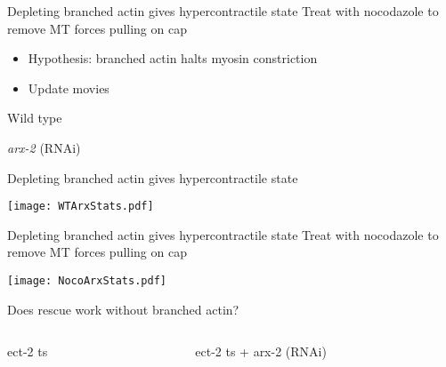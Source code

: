 \documentclass{beamer}
\newcommand{\6}[1]{#1_{\text{6}}}
\newcommand{\3}[1]{#1_{\text{3}}}
\newcommand{\red}[1]{\color{red}#1\normalcolor}
\begin{document}
\begin{frame}{Depleting branched actin gives hypercontractile state}
Treat with nocodazole to remove MT forces pulling on cap
\begin{itemize}
\item Hypothesis: branched actin halts myosin constriction
\item \red{Update movies}
\end{itemize}

\begin{center}
Wild type



\emph{arx-2} (RNAi)

\end{center}

\end{frame}

\begin{frame}{Depleting branched actin gives hypercontractile state}

\begin{center}
\texttt{[image: WTArxStats.pdf]}
\end{center}

\end{frame}

\begin{frame}{Depleting branched actin gives hypercontractile state}
Treat with nocodazole to remove MT forces pulling on cap

\begin{center}
\texttt{[image: NocoArxStats.pdf]}
\end{center}

\end{frame}

\begin{frame}{Does rescue work without branched actin?}
\begin{columns}
\begin{column}{0.5\textwidth}
\begin{center}
ect-2 ts
\end{center}
\end{column}
\begin{column}{0.5\textwidth}
\begin{center}
\phantom{123} ect-2 ts + arx-2 (RNAi)
\end{center}
\end{column}
\end{columns}

\end{frame}
\end{document}

